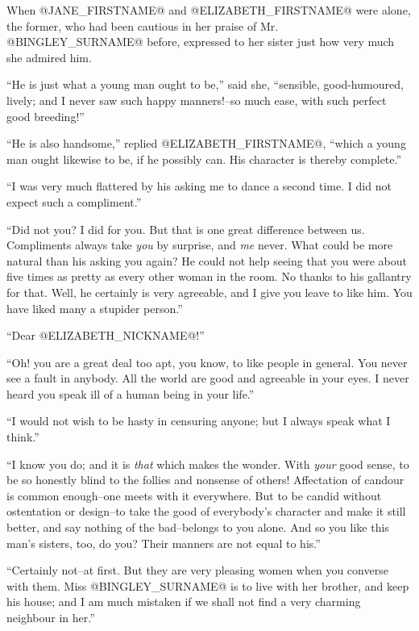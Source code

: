 When @JANE_FIRSTNAME@ and @ELIZABETH_FIRSTNAME@ were alone, the former, who had been cautious in
her praise of Mr. @BINGLEY_SURNAME@ before, expressed to her sister just how very
much she admired him.

``He is just what a young man ought to be,'' said she, ``sensible,
good-humoured, lively; and I never saw such happy manners!--so much
ease, with such perfect good breeding!''

``He is also handsome,'' replied @ELIZABETH_FIRSTNAME@, ``which a young man ought
likewise to be, if he possibly can. His character is thereby complete.''

``I was very much flattered by his asking me to dance a second time. I
did not expect such a compliment.''

``Did not you? I did for you. But that is one great difference between
us. Compliments always take \textit{you} by surprise, and \textit{me} never. What
could be more natural than his asking you again? He could not help
seeing that you were about five times as pretty as every other woman
in the room. No thanks to his gallantry for that. Well, he certainly is
very agreeable, and I give you leave to like him. You have liked many a
stupider person.''

``Dear @ELIZABETH_NICKNAME@!''

``Oh! you are a great deal too apt, you know, to like people in general.
You never see a fault in anybody. All the world are good and agreeable
in your eyes. I never heard you speak ill of a human being in your
life.''

``I would not wish to be hasty in censuring anyone; but I always speak
what I think.''

``I know you do; and it is \textit{that} which makes the wonder. With \textit{your}
good sense, to be so honestly blind to the follies and nonsense of
others! Affectation of candour is common enough--one meets with it
everywhere. But to be candid without ostentation or design--to take the
good of everybody's character and make it still better, and say nothing
of the bad--belongs to you alone. And so you like this man's sisters,
too, do you? Their manners are not equal to his.''

``Certainly not--at first. But they are very pleasing women when you
converse with them. Miss @BINGLEY_SURNAME@ is to live with her brother, and keep
his house; and I am much mistaken if we shall not find a very charming
neighbour in her.''

